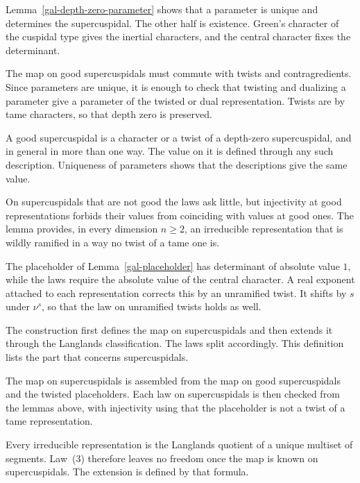 Lemma~\ref{gal-depth-zero-parameter} shows that a parameter is unique and determines the
supercuspidal. The other half is existence. Green's character of the cuspidal type gives the inertial
characters, and the central character fixes the determinant.

The map on good supercuspidals must commute with twists and contragredients. Since parameters are
unique, it is enough to check that twisting and dualizing a parameter give a parameter of the twisted
or dual representation. Twists are by tame characters, so that depth zero is preserved.

A good supercuspidal is a character or a twist of a depth-zero supercuspidal, and in general in more
than one way. The value on it is defined through any such description. Uniqueness of parameters
shows that the descriptions give the same value.

On supercuspidals that are not good the laws ask little, but injectivity at good representations
forbids their values from coinciding with values at good ones. The lemma provides, in every dimension
$n\geq2$, an irreducible representation that is wildly ramified in a way no twist of a tame one is.

The placeholder of Lemma~\ref{gal-placeholder} has determinant of absolute value $1$, while the laws
require the absolute value of the central character. A real exponent attached to each
representation corrects this by an unramified twist. It shifts by $s$ under $\nu^s$, so that the law
on unramified twists holds as well.

The construction first defines the map on supercuspidals and then extends it through the Langlands
classification. The laws split accordingly. This definition lists the part that concerns
supercuspidals.

The map on supercuspidals is assembled from the map on good supercuspidals and the twisted
placeholders. Each law on supercuspidals is then checked from the lemmas above, with injectivity
using that the placeholder is not a twist of a tame representation.

Every irreducible representation is the Langlands quotient of a unique multiset of segments. Law~(3)
therefore leaves no freedom once the map is known on supercuspidals. The extension is defined by that
formula.

